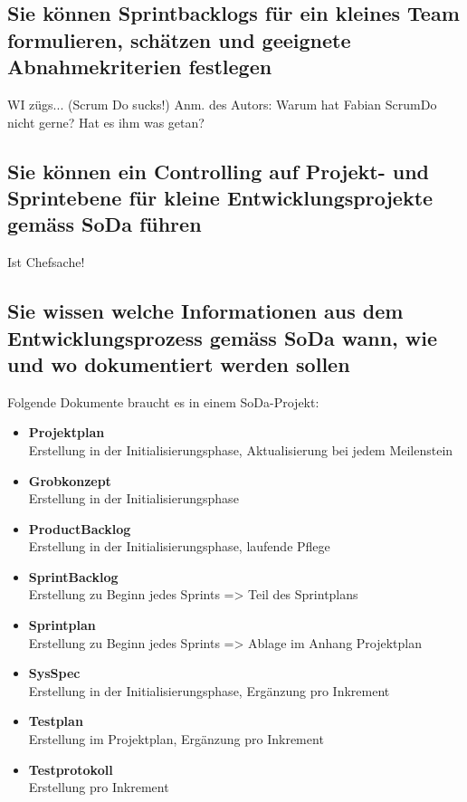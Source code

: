 \subsection{Sie können Sprintbacklogs für ein kleines Team formulieren, schätzen und geeignete Abnahmekriterien festlegen}

WI zügs... (Scrum Do sucks!) Anm. des Autors: Warum hat Fabian ScrumDo nicht gerne? Hat es ihm was getan?

\subsection{Sie können ein Controlling auf Projekt- und Sprintebene für kleine Entwicklungsprojekte gemäss SoDa führen}

Ist Chefsache!

\subsection{Sie wissen welche Informationen aus dem Entwicklungsprozess gemäss SoDa wann, wie und wo dokumentiert werden sollen}

Folgende Dokumente braucht es in einem SoDa-Projekt:

\begin{itemize}
	\item \textbf{Projektplan} \\
		  Erstellung in der Initialisierungsphase, Aktualisierung bei jedem Meilenstein
	\item \textbf{Grobkonzept} \\ 
		  Erstellung in der Initialisierungsphase
	\item \textbf{ProductBacklog} \\
		  Erstellung in der Initialisierungsphase, laufende Pflege
	\item \textbf{SprintBacklog} \\
		  Erstellung zu Beginn jedes Sprints => Teil des Sprintplans
	\item \textbf{Sprintplan} \\
		  Erstellung zu Beginn jedes Sprints => Ablage im Anhang Projektplan
	\item \textbf{SysSpec} \\
		  Erstellung in der Initialisierungsphase, Ergänzung pro Inkrement
	\item \textbf{Testplan} \\
		  Erstellung im Projektplan, Ergänzung pro Inkrement
	\item \textbf{Testprotokoll} \\
		  Erstellung pro Inkrement
\end{itemize}